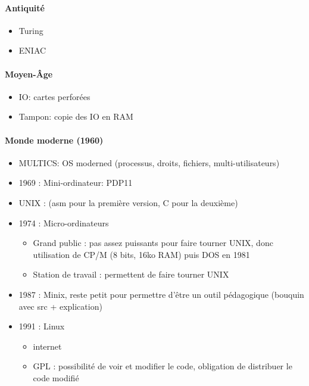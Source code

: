 \documentclass[11pt]{article}
\begin{document}
\paragraph{Antiquité}
\begin{itemize}
    \item Turing
    \item ENIAC
\end{itemize}

\paragraph{Moyen-Âge}
\begin{itemize}
    \item IO: cartes perforées
    \item Tampon: copie des IO en RAM
\end{itemize}

\paragraph{Monde moderne (1960)}
\begin{itemize}
    \item MULTICS: OS moderned (processus, droits, fichiers, multi-utilisateurs)
    \item 1969 : Mini-ordinateur: PDP11
    \item UNIX : (asm pour la première version, C pour la deuxième)
    \item 1974 : Micro-ordinateurs
    \begin{itemize}
        \item Grand public : pas assez puissants pour faire tourner UNIX, donc utilisation de CP/M (8 bits, 16ko RAM) puis DOS en 1981
        \item Station de travail : permettent de faire tourner UNIX
    \end{itemize}
    \item 1987 : Minix, reste petit pour permettre d'être un outil pédagogique (bouquin avec src + explication)
    \item 1991 : Linux \begin{itemize}
        \item internet
        \item GPL : possibilité de voir et modifier le code, obligation de distribuer le code modifié
    \end{itemize}

\end{itemize}
\end{document}
